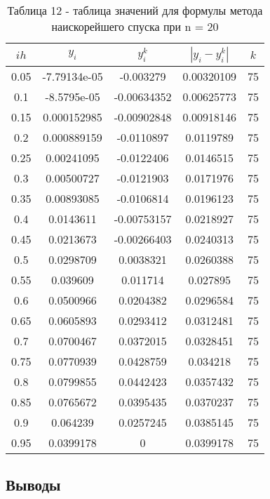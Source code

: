 \documentclass[a4paper,12pt]{article}
\begin{document}
\begin{enumerate}[label = \arabic*.]
{\begin{table}[h]
\begin{tabular}{|c|c|c|c|c|}
      \hline
      $ih$ & $y_i$ & $y^k_i$ & $\left|y_i-y^k_i\right|$ & $k$\\ \hline
      0.05 & -7.79134e-05 &    -0.003279 &   0.00320109 & 75\\ \hline
      0.1 &  -8.5795e-05 &  -0.00634352 &   0.00625773 & 75\\ \hline
      0.15 &  0.000152985 &  -0.00902848 &   0.00918146 & 75\\ \hline
      0.2 &  0.000889159 &   -0.0110897 &    0.0119789 & 75\\ \hline
      0.25 &   0.00241095 &   -0.0122406 &    0.0146515 & 75\\ \hline
      0.3 &   0.00500727 &   -0.0121903 &    0.0171976 & 75\\ \hline
      0.35 &   0.00893085 &   -0.0106814 &    0.0196123 & 75\\ \hline
      0.4 &    0.0143611 &  -0.00753157 &    0.0218927 & 75\\ \hline
      0.45 &    0.0213673 &  -0.00266403 &    0.0240313 & 75\\ \hline
      0.5 &    0.0298709 &    0.0038321 &    0.0260388 & 75\\ \hline
      0.55 &     0.039609 &     0.011714 &     0.027895 & 75\\ \hline
      0.6 &    0.0500966 &    0.0204382 &    0.0296584 & 75\\ \hline
      0.65 &    0.0605893 &    0.0293412 &    0.0312481 & 75\\ \hline
      0.7 &    0.0700467 &    0.0372015 &    0.0328451 & 75\\ \hline
      0.75 &    0.0770939 &    0.0428759 &     0.034218 & 75\\ \hline
      0.8 &    0.0799855 &    0.0442423 &    0.0357432 & 75\\ \hline
      0.85 &    0.0765672 &    0.0395435 &    0.0370237 & 75\\ \hline
      0.9 &     0.064239 &    0.0257245 &    0.0385145 & 75\\ \hline
      0.95 &    0.0399178 &            0 &    0.0399178 & 75\\ \hline
      \end{tabular}
      \caption*{\small{Таблица 12 - таблица значений для формулы метода наискорейшего спуска при n = 20}}
    \end{table}
  }
\end{enumerate}
\newpage

\begin{center}
\section{Выводы}
\end{center}
\end{document}
